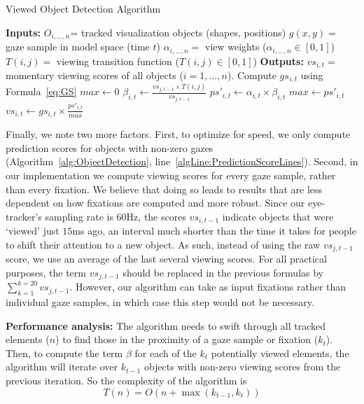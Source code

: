 \begin{algorithm}
\caption{Viewed Object Detection Algorithm}
\label{alg:ObjectDetection}
\begin{algorithmic}[1]
\State \textbf{Inputs: } 
\Statex $O_{i, \ldots, n}$= tracked visualization objects (shapes, positions)
\Statex $g(x,y) = $ gaze sample in model space (time $t$)
\Statex $\alpha_{i, \ldots, n} = $ view weights ($\alpha_{i, \ldots, n} \in [0,1]$)
\Statex $T(i,j) = $ viewing transition function ($T(i,j) \in [0,1]$)
\State \textbf{Outputs:}
\Statex $vs_{i,t} = $ momentary viewing scores of all objects ($i = 1, \ldots, n$). 
	\State Compute $gs_{i,t}$	using Formula~\ref{eq:GS}
\EndFor
\State $max \gets 0$
	 \label{algLine:PredictionScoreLines}
		\State $\beta_{i,t} \gets \frac{vs_{j,t-1} \times T(i,j)}{vs_{j,t-1}}$
		\State $ps'_{i,t} \gets \alpha_{i,t} \times \beta_{i,t}$
			\State $max \gets ps'_{i,t}$
		\EndIf
	\EndIf
\EndFor
{}
	\State $vs_{i,t} \gets gs_{i,t} \times \frac{ps'_{i,t}}{max} $
\EndFor
\end{algorithmic}
\end{algorithm}

Finally, we note two more factors. First, to optimize for speed, we only compute prediction scores for objects with non-zero gazes (Algorithm~\ref{alg:ObjectDetection}, line~\ref{algLine:PredictionScoreLines}). Second, in our implementation we compute viewing scores for every gaze sample, rather than every fixation. We believe that doing so leads to results that are less dependent on how fixations are computed and more robust. Since our eye-tracker's sampling rate is $60$Hz, the scores $vs_{i, t-1}$ indicate objects that were `viewed' just $15$ms ago, an interval much shorter than the time it takes for people to shift their attention to a new object. As such, instead of using the raw $vs_{j,t-1}$ score, we use an average of the last several viewing scores. For all practical purposes, the term $vs_{j,t-1}$ should be replaced in the previous formulas by $ \sum_{k=1}^{k=20}{vs_{j,t-1}}$.  However, our algorithm can take as input fixations rather than individual gaze samples, in which case this step would not be necessary. 

{\bf Performance analysis:} The algorithm needs to swift through all tracked elements ($n$) to find those in the proximity of a gaze sample or fixation ($k_t$). Then, to compute the term $\beta$ for each of the $k_t$ potentially viewed elements, the algorithm will iterate over $k_{t-1}$ objects with non-zero viewing scores from the previous iteration. So the complexity of the algorithm is 
\begin{equation*}
T(n) = O( n+ \max (k_{t-1}, k_t)) 
\label{eq:RuntimeComplexity}
\end{equation*}


